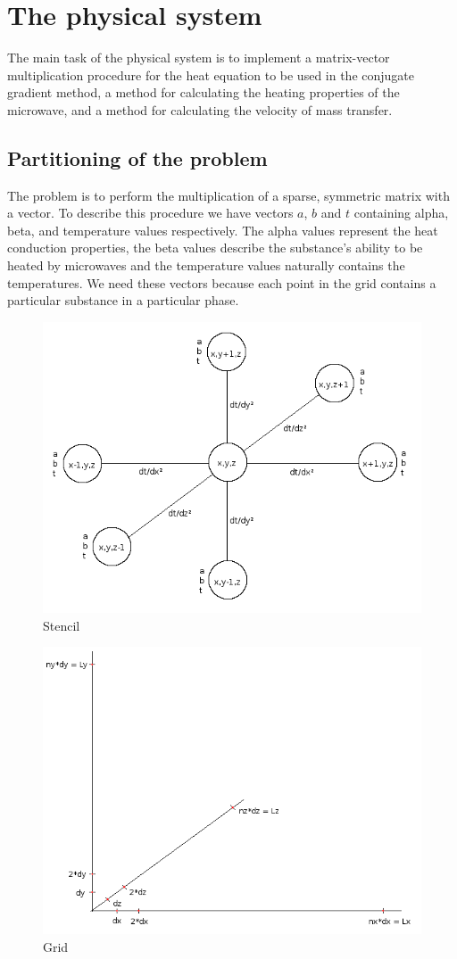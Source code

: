 \section{The physical system}

The main task of the physical system is to implement a matrix-vector multiplication
procedure for the heat equation to be used in the conjugate gradient method, 
a method for calculating the heating properties of the microwave, and a method 
for calculating the velocity of mass transfer.

\subsection{Partitioning of the problem}

The problem is to perform the multiplication of a sparse, symmetric matrix with a
vector. To describe this procedure we have vectors $a$, $b$ and $t$ containing alpha,
beta, and temperature values respectively. The alpha values represent the heat 
conduction properties, the beta values describe the substance's ability to be heated
by microwaves and the temperature values naturally contains the temperatures. We need
these vectors because each point in the grid contains a particular substance in
a particular phase.
\begin{figure}[!h]
  \begin{center}
    \includegraphics[width=0.5\linewidth]{stencil.png}
  \end{center}
  \caption{Stencil}
  \label{fig:stencil}
\end{figure}
\begin{figure}[!h]
  \begin{center}
    \includegraphics[width=0.5\linewidth]{grid.png}
  \end{center}
  \caption{Grid}
  \label{fig:grid}
\end{figure}
